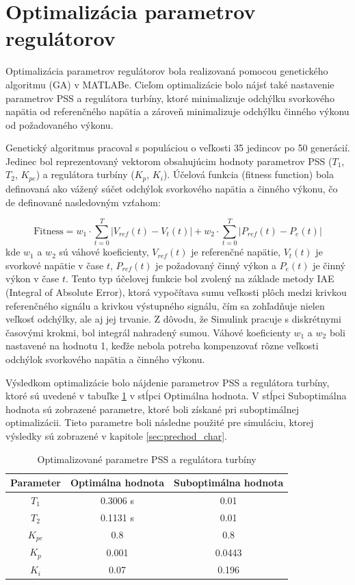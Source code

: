 \section{Optimalizácia parametrov regulátorov}
\label{sec:optimalizacia}

Optimalizácia parametrov regulátorov bola realizovaná pomocou genetického algoritmu (GA) v MATLABe. Cieľom optimalizácie bolo nájsť také nastavenie parametrov PSS a regulátora turbíny, ktoré minimalizuje odchýlku svorkového napätia od referenčného napätia a zároveň minimalizuje odchýlku činného výkonu od požadovaného výkonu.

Genetický algoritmus pracoval s populáciou o veľkosti 35 jedincov po 50 generácií. Jedinec bol reprezentovaný vektorom obsahujúcim hodnoty parametrov PSS ($T_1$, $T_2$, $K_{pe}$) a regulátora turbíny ($K_p$, $K_i$). Účelová funkcia (fitness function) bola definovaná ako vážený súčet odchýlok svorkového napätia a činného výkonu, čo de definované nasledovným vzťahom:

\begin{equation}
\text{Fitness} = w_1 \cdot \sum_{t=0}^{T} \left|V_{ref}(t) - V_{t}(t)\right| + w_2 \cdot \sum_{t=0}^{T} \left|P_{ref}(t) - P_e(t)\right|
\end{equation}
kde $w_1$ a $w_2$ sú váhové koeficienty, $V_{ref}(t)$ je referenčné napätie, $V_{t}(t)$ je svorkové napätie v čase $t$, $P_{ref}(t)$ je požadovaný činný výkon a $P_e(t)$ je činný výkon v čase $t$. Tento typ účelovej funkcie bol zvolený na základe metody IAE (Integral of Absolute Error), ktorá vypočítava sumu veľkosti plôch medzi krivkou referenčného signálu a krivkou výstupného signálu, čím sa zohľadňuje nielen veľkosť odchýlky, ale aj jej trvanie. Z dôvodu, že Simulink pracuje s diskrétnymi časovými krokmi, bol integrál nahradený sumou. Váhové koeficienty $w_1$ a $w_2$ boli nastavené na hodnotu 1, keďže nebola potreba kompenzovať rôzne veľkosti odchýlok svorkového napätia a činného výkonu. 

Výsledkom optimalizácie bolo nájdenie parametrov PSS a regulátora turbíny, ktoré sú uvedené v tabuľke \ref{tab:optimalne_parametre} v stĺpci Optimálna hodnota. V stĺpci Suboptimálna hodnota sú zobrazené parametre, ktoré boli získané pri suboptimálnej optimalizácii. Tieto parametre boli následne použité pre simuláciu, ktorej výsledky sú zobrazené v kapitole \ref{sec:prechod_char}.

\begin{table}[h]
    \centering
    \begin{tabular}{cc|c}
        \hline
        Parameter & Optimálna hodnota & Suboptimálna hodnota\\
        \hline
        $T_1$ & 0.3006 s & 0.01\\
        $T_2$ & 0.1131 s & 0.01\\
        $K_{pe}$ & 0.8 & 0.8\\
        $K_p$ & 0.001 & 0.0443\\
        $K_i$ & 0.07 & 0.196\\
        \hline
    \end{tabular}
    \caption{Optimalizované parametre PSS a regulátora turbíny}
    \label{tab:optimalne_parametre}
\end{table}

